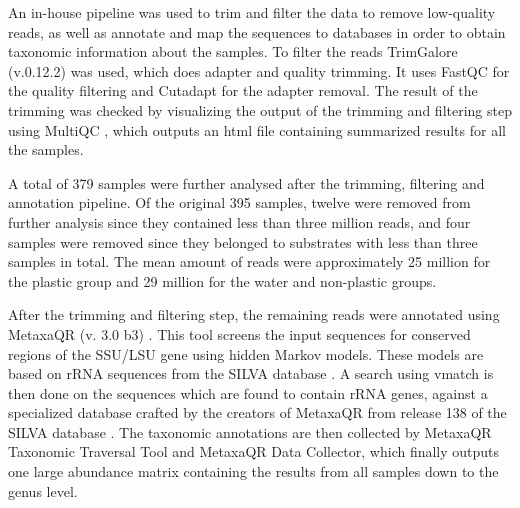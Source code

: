 
An in-house pipeline \cite{wenne2025Pipeline1} was used to trim and filter the data to remove low-quality reads, as well as annotate and map the sequences to databases in order to obtain taxonomic information about the samples.
To filter the reads TrimGalore (v.0.12.2) \cite{krueger2023TrimGalore0122} was used, which does adapter and quality trimming. It uses FastQC for the quality filtering and Cutadapt for the adapter removal.
The result of the trimming was checked by visualizing the output of the trimming and filtering step using MultiQC \cite{ewels2016MultiQCSummarizeAnalysis}, which outputs an html file containing summarized results for all the samples. 

A total of 379 samples were further analysed after the trimming, filtering and annotation pipeline.  
Of the original 395 samples, twelve were removed from further analysis since they contained less than three million reads, and four samples were removed since they belonged to substrates with less than three samples in total.
The mean amount of reads were approximately 25 million for the plastic group and 29 million for the water and non-plastic groups.


After the trimming and filtering step, the remaining reads were annotated using MetaxaQR (v. 3.0 b3) \cite{bengtsson-palme2015Metaxa2Improved}. This tool screens the input sequences for conserved regions of the SSU/LSU gene using hidden Markov models. These models are based on rRNA sequences from the SILVA database \cite{quast2012SILVARibosomalRNA}.
    A search using vmatch \cite{kurtzVmatchLargeScale} is then done on the sequences which are found to contain rRNA genes, against a specialized database crafted by the creators of MetaxaQR from release 138 of the SILVA database \cite{bengtsson-palmeMetaxaQRFAQMicrobiologyse}.%
The taxonomic annotations are then collected by MetaxaQR Taxonomic Traversal Tool and MetaxaQR Data Collector, which finally outputs one large abundance matrix containing the results from all samples down to the genus level. 

